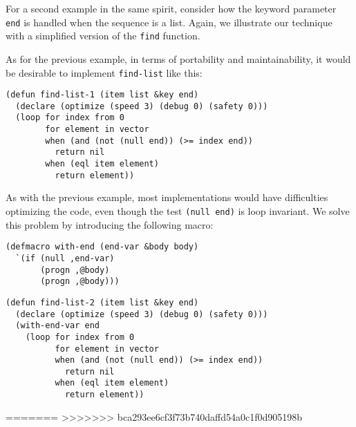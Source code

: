 For a second example in the same spirit, consider how the keyword
parameter \texttt{end} is handled when the sequence is a list.
Again, we illustrate our technique with a simplified version of the
\texttt{find} function.

As for the previous example, in terms of portability and
maintainability, it would be desirable to implement
\texttt{find-list} like this:

{\small\begin{verbatim}
(defun find-list-1 (item list &key end)
  (declare (optimize (speed 3) (debug 0) (safety 0)))
  (loop for index from 0
        for element in vector
        when (and (not (null end)) (>= index end))
          return nil
        when (eql item element)
          return element))
\end{verbatim}}

As with the previous example, most \commonlisp{} implementations would
have difficulties optimizing the code, even though the test
\texttt{(null end)} is loop invariant.  We solve this problem by
introducing the following macro:

{\small\begin{verbatim}
(defmacro with-end (end-var &body body)
  `(if (null ,end-var)
       (progn ,@body)
       (progn ,@body)))
\end{verbatim}}

{\small\begin{verbatim}
(defun find-list-2 (item list &key end)
  (declare (optimize (speed 3) (debug 0) (safety 0)))
  (with-end-var end
    (loop for index from 0
          for element in vector
          when (and (not (null end)) (>= index end))
            return nil
          when (eql item element)
            return element))
\end{verbatim}}
=======
>>>>>>> bca293ee6cf3f73b740daffd54a0c1f0d905198b
